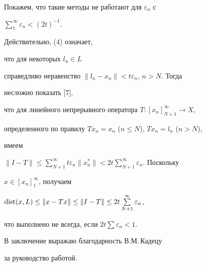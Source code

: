  


Покажем, что такие методы не работают для $\varepsilon_n$ с 


$\sum\limits^\infty_1\varepsilon_n<(2t)^{-1}$. 


Действительно, (4) означает, 


что для некоторых $l_n\in L$ 


справедливо неравенство $\|l_n-x_n\|<t\varepsilon_n$, $n>N$. Тогда 


несложно показать [7], 


что для линейного непрерывного оператора $T:[x_n]^\infty_{N+1}\to X$, 


определенного по правилу $T x_n=x_n$ ($n\le N$), $T x_n=l_n$ ($n>N$), 


имеем 


$\|I-T\|\le\sum\limits^\infty_{N+1}t\varepsilon_n\|x^*_n\| 


<2t\sum\limits^\infty_{N+1}\varepsilon_n$. Поскольку 


$x\in[x_n]^\infty_1$, получаем 


$\dist(x,L)\le\|x-T x\|\le\|I-T\|\le 2t 


\sum\limits^\infty_{N+1}\varepsilon_n$, 


что выполнено не всегда, если $2t\sum\varepsilon_n<1$. 


 


В заключение выражаю благодарность В.М.\,Кадецу 


за руководство работой. 


 



